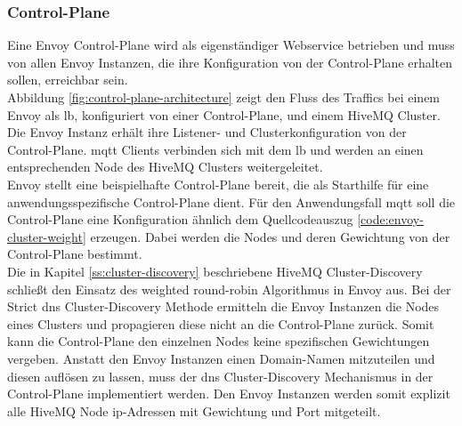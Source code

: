 \subsubsection{Control-Plane} \label{ss:control-plane}
Eine Envoy Control-Plane wird als eigenständiger Webservice betrieben und muss von allen Envoy Instanzen, die ihre Konfiguration von der Control-Plane erhalten sollen, erreichbar sein.
\\
Abbildung \ref{fig:control-plane-architecture} zeigt den Fluss des Traffics bei einem Envoy als \acl{lb}, konfiguriert von einer Control-Plane, und einem HiveMQ Cluster. Die Envoy Instanz erhält ihre Listener- und Clusterkonfiguration von der Control-Plane. \ac{mqtt} Clients verbinden sich mit dem \ac{lb} und werden an einen entsprechenden Node des HiveMQ Clusters weitergeleitet.
\\
Envoy stellt eine beispielhafte Control-Plane \cite{DynamicConfigurationControl} bereit, die als Starthilfe für eine anwendungsspezifische Control-Plane dient. Für den Anwendungsfall \ac{mqtt} soll die Control-Plane eine Konfiguration ähnlich dem Quellcodeauszug \ref{code:envoy-cluster-weight} erzeugen. Dabei werden die Nodes und deren Gewichtung von der Control-Plane bestimmt.
\\
Die in Kapitel \ref{ss:cluster-discovery} beschriebene HiveMQ Cluster-Discovery schlie{\ss}t den Einsatz des weighted round-robin Algorithmus in Envoy aus.
Bei der Strict \ac{dns} Cluster-Discovery Methode ermitteln die Envoy Instanzen die Nodes eines Clusters und propagieren diese nicht an die Control-Plane zurück. Somit kann die Control-Plane den einzelnen Nodes keine spezifischen Gewichtungen vergeben.
Anstatt den Envoy Instanzen einen Domain-Namen mitzuteilen und diesen auflösen zu lassen, muss der \ac{dns} Cluster-Discovery Mechanismus in der Control-Plane implementiert werden. Den Envoy Instanzen werden somit explizit alle HiveMQ Node \ac{ip}-Adressen mit Gewichtung und Port mitgeteilt.
